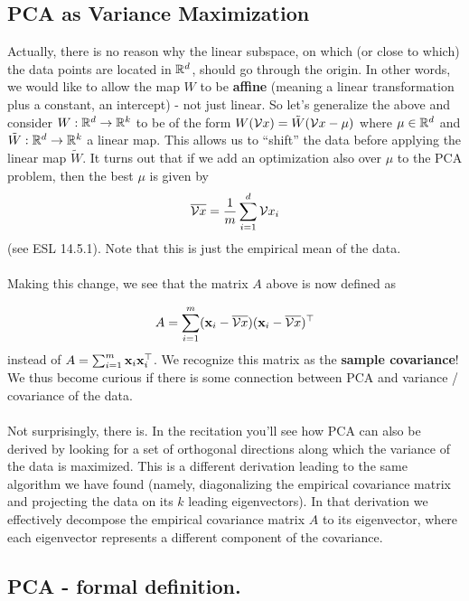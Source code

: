 \subsection{PCA as Variance Maximization}

Actually, there is no reason why the linear subspace, on which (or close to
which) the data points are located in $\mathbb{R}^d$, should go through the origin. In
other words, we would like to allow the map $W$ to be {\bf affine} (meaning a
linear transformation plus a constant, an intercept) - not just linear.
So let's generalize the above and consider $W:\mathbb{R}^d\to\mathbb{R}^k$ to be of the
form $W(\mathcal{V}{x}) = \tilde{W}(\mathcal{V}{x}-\mu)$ where $\mu\in\mathbb{R}^d$ and
$\tilde{W}:\mathbb{R}^d\to\mathbb{R}^k$ a linear map.  This allows us to
``shift'' the data before applying the linear map $\tilde{W}$. 
It turns out that if we add an optimization also over $\mu$ to the PCA problem,
then the best $\mu$ is given by 
\[
  \overline{\mathcal{V}{x}} = \frac{1}{m}\sum_{i=1}^d \mathcal{V}{x}_i
\]
(see ESL 14.5.1). Note that this is just the empirical mean of the data. 
\\~\\
Making this change, we see that the matrix $A$ above is now defined as

\[
  A = \sum_{i=1}^m ({\mathbf x}_i-\overline{\mathcal{V}{x}}) ({\mathbf x}_i-\overline{\mathcal{V}{x}})^\top
\]
instead of
$A = \sum_{i=1}^m {\mathbf x}_i {\mathbf x}_i^\top$.
We recognize this matrix as the {\bf sample covariance}! We thus become curious
if there is some connection between PCA and variance / covariance of the data.
\\~\\
Not  surprisingly, there is. In the recitation you'll see how PCA can also be
derived by looking for a set of orthogonal 
directions along which the variance of the data is maximized. This is a
different derivation leading to the same algorithm we have found 
(namely, diagonalizing the
empirical covariance matrix and projecting the data on its $k$ 
leading eigenvectors). In that derivation we effectively decompose the empirical
covariance matrix $A$ to its eigenvector, where each eigenvector represents a
different component of the covariance.

\subsection{PCA - formal definition.}

